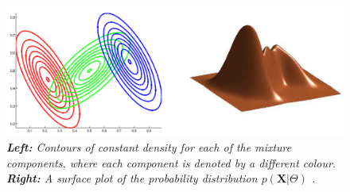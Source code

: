 \begin{figure}[!ht]
	\begin{center}
 		\includegraphics[scale = 0.43]{images/gmm.png}
		 	  \caption{\emph{\textbf{Left:} Contours of constant density for each of the mixture components, where each component is denoted by a different colour. \textbf{Right:} A surface plot of the probability distribution $p(\mathbf{X}|\Theta)$ \cite[Ch. \ 2]{Bishop2006}.}}
		\label{gmm-pic}
	\end{center}
\end{figure}


